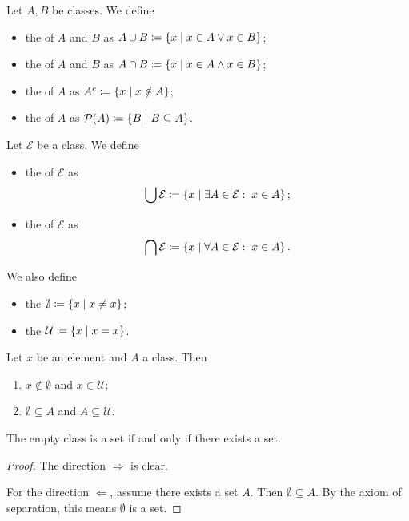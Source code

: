 \begin{definition}
Let $A,B$ be classes. We define
\begin{itemize}
\item the  of $A$ and $B$ as $A \cup B \coloneqq \left\{ x \;\middle|\; x\in A \lor x\in B \right\}$;
\item the  of $A$ and $B$ as $A \cap B \coloneqq \left\{ x \;\middle|\; x\in A \land x\in B \right\}$;
\item the  of $A$ as $A^c \coloneqq \left\{ x \;\middle|\; x\notin A \right\}$;
\item the  of $A$ as $\operatorname{\mathcal{P}}(A) \coloneqq \left\{ B \;\middle|\; B \subseteq A \right\}$.
\end{itemize}
Let $\mathcal{E}$ be a class. We define
\begin{itemize}
\item the  of $\mathcal{E}$ as
\[ \bigcup \mathcal{E} \coloneqq \left\{ x \;\middle|\; \exists A\in \mathcal{E}: \; x\in A \right\}; \]
\item the  of $\mathcal{E}$ as
\[ \bigcap \mathcal{E} \coloneqq \left\{ x \;\middle|\; \forall A\in \mathcal{E}: \; x\in A \right\}. \]
\end{itemize}
We also define
\begin{itemize}
\item the  $\emptyset \coloneqq \left\{ x \;\middle|\; x \neq x \right\}$;
\item the  $\mathcal{U} \coloneqq \left\{ x \;\middle|\; x = x \right\}$.
\end{itemize}
\end{definition}

\begin{lemma}
Let $x$ be an element and $A$ a class. Then
\begin{enumerate}
\item $x\notin \emptyset$ and $x\in \mathcal{U}$;
\item $\emptyset \subseteq A$ and $A \subseteq \mathcal{U}$.
\end{enumerate}
\end{lemma}

\begin{lemma}
The empty class is a set \textup{if and only if} there exists a set.
\end{lemma}
\begin{proof}
The direction $\Rightarrow$ is clear.

For the direction $\Leftarrow$, assume there exists a set $A$. Then $\emptyset \subseteq A$. By the axiom of separation, this means $\emptyset$ is a set.
\end{proof}

